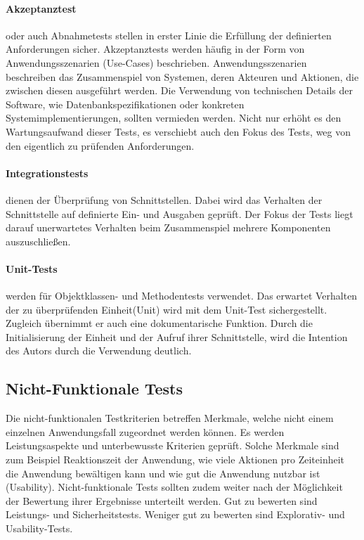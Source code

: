 \paragraph{Akzeptanztest}
oder auch Abnahmetests stellen in erster Linie die Erfüllung der definierten Anforderungen sicher. Akzeptanztests werden häufig in der Form von Anwendungsszenarien (Use-Cases) beschrieben. Anwendungsszenarien beschreiben das Zusammenspiel von Systemen, deren Akteuren und Aktionen, die zwischen diesen ausgeführt werden. Die Verwendung von technischen Details der Software, wie Datenbankspezifikationen oder konkreten Systemimplementierungen, sollten vermieden werden. Nicht nur erhöht es den Wartungsaufwand dieser Tests, es verschiebt auch den Fokus des Tests, weg von den eigentlich zu prüfenden Anforderungen.

\paragraph{Integrationstests}

dienen der Überprüfung von Schnittstellen. Dabei wird das Verhalten der Schnittstelle auf definierte Ein- und Ausgaben geprüft. Der Fokus der Tests liegt darauf unerwartetes Verhalten beim Zusammenspiel mehrere Komponenten auszuschließen.

\paragraph{Unit-Tests}

werden für Objektklassen- und Methodentests verwendet. Das erwartet Verhalten der zu überprüfenden Einheit(Unit) wird mit dem Unit-Test sichergestellt. Zugleich übernimmt er auch eine dokumentarische Funktion. Durch die Initialisierung der Einheit und der Aufruf ihrer Schnittstelle, wird die Intention des Autors durch die Verwendung deutlich.

\subsection{Nicht-Funktionale Tests}

Die nicht-funktionalen Testkriterien betreffen Merkmale, welche nicht einem einzelnen Anwendungsfall zugeordnet werden können. Es werden Leistungsaspekte und unterbewusste Kriterien geprüft. Solche Merkmale sind zum Beispiel Reaktionszeit der Anwendung, wie viele Aktionen pro Zeiteinheit die Anwendung bewältigen kann und wie gut die Anwendung nutzbar ist (Usability). Nicht-funktionale Tests sollten zudem weiter nach der Möglichkeit der Bewertung ihrer Ergebnisse unterteilt werden. Gut zu bewerten sind Leistungs- und Sicherheitstests. Weniger gut zu bewerten sind Explorativ- und Usability-Tests.

